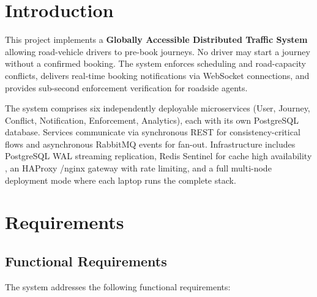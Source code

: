 \documentclass[11pt,a4paper]{article}
\begin{document}
\newpage
\section{Introduction}

This project implements a \textbf{Globally Accessible Distributed Traffic System} allowing road-vehicle drivers to pre-book journeys. No driver may start a journey without a confirmed booking. The system enforces scheduling and road-capacity conflicts, delivers real-time booking notifications via WebSocket connections, and provides sub-second enforcement verification for roadside agents.

The system comprises six independently deployable microservices (User, Journey, Conflict, Notification, Enforcement, Analytics), each with its own PostgreSQL database. Services communicate via synchronous REST  for consistency-critical flows and asynchronous RabbitMQ events for fan-out. Infrastructure includes PostgreSQL WAL  streaming replication, Redis Sentinel for cache high availability , an HAProxy /nginx gateway with rate limiting, and a full multi-node deployment mode where each laptop runs the complete stack.

\section{Requirements}
\label{sec:requirements}

\subsection{Functional Requirements}

The system addresses the following functional requirements:
 
\end{document}
